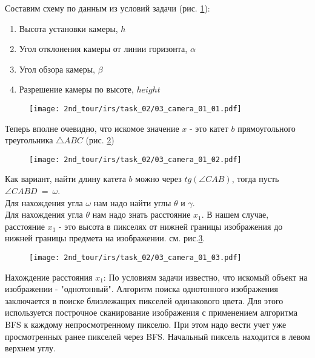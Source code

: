 \solutionSection

Составим схему по данным из условий задачи (рис. \ref{fig:03_camera_01_01}):
\begin{enumerate}
	\item Высота установки камеры, $h$
	\item Угол отклонения камеры от линии горизонта, $\alpha$
	\item Угол обзора камеры, $\beta$
	\item Разрешение камеры по высоте, $height$
\end{enumerate}

\begin{figure}[h!]
	\centering
	\texttt{[image: 2nd\_tour/irs/task\_02/03\_camera\_01\_01.pdf]}
	\caption{}
	\label{fig:03_camera_01_01}
\end{figure}

Теперь вполне очевидно, что искомое значение $x$ - это катет $b$ прямоугольного треугольника $\triangle ABC$ (рис. \ref{fig:03_camera_01_02})

\begin{figure}[h!]
	\centering
	\texttt{[image: 2nd\_tour/irs/task\_02/03\_camera\_01\_02.pdf]}
	\caption{}
	\label{fig:03_camera_01_02}
\end{figure}

Как вариант, найти длину катета $b$ можно через $tg(\angle CAB)$, тогда пусть $\angle CABD~=~\omega$.\\
Для нахождения угла $\omega$ нам надо найти углы $\theta$ и $\gamma$. \\
Для нахождения угла $\theta$ нам надо знать расстояние $x_1$. В нашем случае, расстояние $x_1$ - это высота в пикселях от нижней границы изображения до нижней границы предмета на изображении. см. рис.\ref{fig:03_camera_01_03}.

\begin{figure}[h!]
	\centering
	\texttt{[image: 2nd\_tour/irs/task\_02/03\_camera\_01\_03.pdf]}
	\caption{}
	\label{fig:03_camera_01_03}
\end{figure}

Нахождение расстояния $x_1$:
По условиям задачи известно, что искомый объект на изображении - "однотонный".
Алгоритм поиска однотонного изображения заключается в поиске близлежащих пикселей одинакового цвета. Для этого используется построчное сканирование изображения с применением алгоритма BFS к каждому непросмотренному пикселю. При этом надо вести учет уже просмотренных ранее пикселей через BFS. Начальный пиксель находится в левом верхнем углу.

